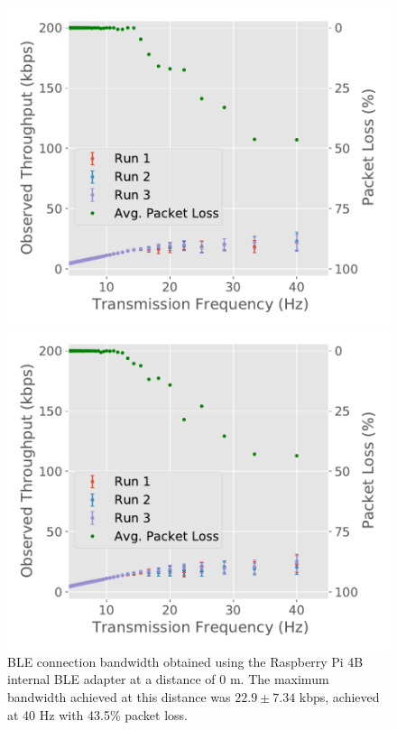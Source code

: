 \begin{figure}[H]
    \centering
    \begin{minipage}{0.45\linewidth}
        \centering
        \includegraphics[width=\linewidth]{images/ble-bandwidth-hci1-0cm.pdf}
        \caption[\acs{BLE} connection bandwidth obtained using the ASUS USB-BT500 adapter at a distance of 0 m.]
        {\acs{BLE} connection bandwidth obtained using the Raspberry Pi 4B internal \acs{BLE} adapter at a distance of $0\text{ m}$. The maximum bandwidth achieved at this distance was $22.9 \pm 7.34$ kbps, achieved at 40 Hz with 43.5\% packet loss.}
        \label{fig:ble-bandwidth-hci1-0m}
    \end{minipage}
    \hspace{0.05\linewidth}
    \begin{minipage}{0.45\linewidth}
        \centering
        \includegraphics[width=\linewidth]{images/ble-bandwidth-hci1-300cm.pdf}

\end{minipage}
\end{figure}
